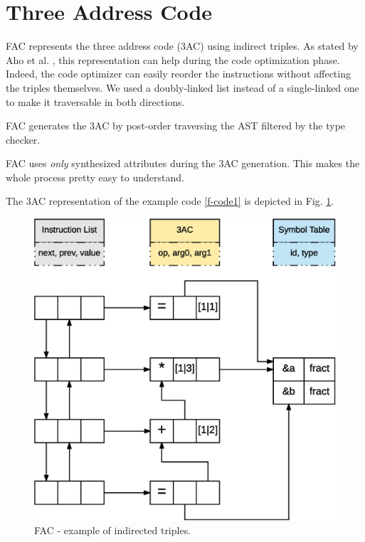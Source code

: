 \section{Three Address Code}
FAC represents the three address code (3AC) using indirect triples. 
As stated by Aho et al. \cite{dragonbook}, this 
representation can help during the code optimization phase.
Indeed, the code optimizer can easily reorder the instructions without affecting
the triples themselves. We used a doubly-linked list instead of a single-linked
one to make it traversable in both directions.

FAC generates the 3AC by post-order traversing the AST filtered by the type checker. 

FAC uses \emph{only} synthesized attributes during the 3AC generation. 
This makes the whole process pretty easy to understand.

The 3AC representation of the example code \ref{f-code1} is depicted in 
Fig. \ref{fig:ind-trpl}.

\begin{figure}[H]
  \centering
  \includegraphics[width=.7\columnwidth]{img/eps/indirect_triples.eps}
  \caption{FAC - example of indirected triples.}
  \label{fig:ind-trpl}
\end{figure}
